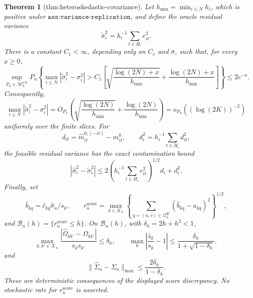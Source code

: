 \documentclass{article}
\newtheorem{theorem}{Theorem}
\begin{document}
\begin{theorem}[thm:heteroskedastic-covariance]\label{thm:heteroskedastic-covariance}
Let \(h_{\min}=\min_{i\le N}h_i\), which is positive under \(\texttt{ass:variance-replication}\), and define the oracle residual variance
\[
 \widetilde\sigma_i^2=h_i^{-1}\sum_{t\in H_i}e_{it}^2.
\]
There is a constant \(C_1<\infty\), depending only on \(C_e\) and \(\bar\sigma\), such that, for every \(x\ge0\),
\[
 \sup_{P_n\in\mathcal M_n^{\mathrm{CY}}}P_n\!\left\{
 \max_{i\le N}|\widetilde\sigma_i^2-\sigma_i^2|>
 C_1\left[\sqrt{\frac{\log(2N)+x}{h_{\min}}}
 +\frac{\log(2N)+x}{h_{\min}}\right]\right\}\le2e^{-x}.
\]
Consequently,
\[
 \max_{i\le N}|\widetilde\sigma_i^2-\sigma_i^2|
 =O_{P_n}\!\left(\sqrt{\frac{\log(2N)}{h_{\min}}}
 +\frac{\log(2N)}{h_{\min}}\right)
 =o_{P_n}((\log(2K))^{-2})
\]
uniformly over the finite slices.  For
\[
 d_{it}=\widehat m_{it}^{0,(-it)}-m^0_{it},
 \qquad
 d_i^2=h_i^{-1}\sum_{t\in H_i}d_{it}^2,
\]
the feasible residual variance has the exact contamination bound
\[
 |\widehat\sigma_i^2-\widetilde\sigma_i^2|
 \le2\left(h_i^{-1}\sum_{t\in H_i}e_{it}^2\right)^{1/2}d_i+d_i^2.
\]
Finally, set
\[
 \widehat b_{kq}=\widehat c_{kq}\widehat\sigma_u/s_k,
 \qquad
 r_n^{\mathrm{score}}=\max_{k\in\mathcal K_n}
 \left\{\sum_{q=(u,v)\in\mathcal Q_n^{\mathrm{IF}}}
 (\widehat b_{kq}-a_{kq})^2\right\}^{1/2},
\]
and \(\mathcal B_n(h)=\{r_n^{\mathrm{score}}\le h\}\).  On \(\mathcal B_n(h)\), with \(\delta_h=2h+h^2<1\),
\[
 \max_{k,k'\in\mathcal K_n}
 \frac{|\widehat\Omega_{kk'}-\Omega_{kk'}|}{s_ks_{k'}}\le\delta_h,
 \qquad
 \max_k\left|\frac{\widehat s_k}{s_k}-1\right|
 \le\frac{\delta_h}{1+\sqrt{1-\delta_h}},
\]
and
\[
 \|\widehat\Sigma_n-\Sigma_n\|_{\max}
 \le\frac{2\delta_h}{1-\delta_h}.
\]
These are deterministic consequences of the displayed score discrepancy.  No stochastic rate for \(r_n^{\mathrm{score}}\) is asserted.
\end{theorem}
\end{document}
